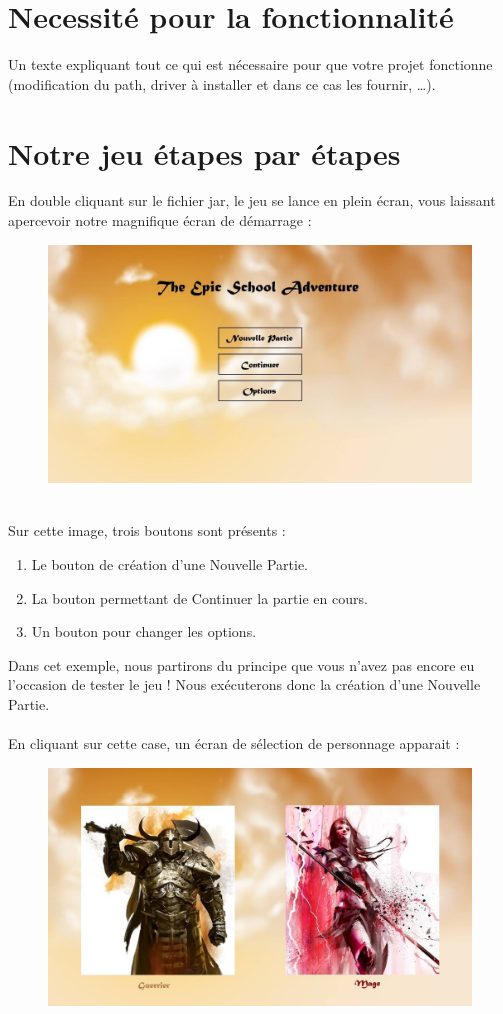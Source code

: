 \documentclass[a4paper,titlepage]{article}
\begin{document}
	\section{Necessité pour la fonctionnalité}
	Un texte expliquant tout ce qui est nécessaire pour que votre projet fonctionne (modification du path, driver à installer et dans ce cas les fournir, …).
	\clearpage
	
	\section{Notre jeu étapes par étapes}
	En double cliquant sur le fichier jar, le jeu se lance en plein écran, vous laissant apercevoir notre magnifique écran de démarrage :
	\begin{figure}[h!]
		\includegraphics[scale=0.30]{EcranDebut.jpg}
	\end{figure}
	\\Sur cette image, trois boutons sont présents : 
	\begin{enumerate}
		\item Le bouton de création d'une Nouvelle Partie.
		\item La bouton permettant de Continuer la partie en cours.
		\item Un bouton pour changer les options.
	\end{enumerate}
	Dans cet exemple, nous partirons du principe que vous n'avez pas encore eu l'occasion de tester le jeu ! Nous exécuterons donc la création d'une Nouvelle Partie.\\
	\\En cliquant sur cette case, un écran de sélection de personnage apparait :
	\begin{figure}[h!]
		\includegraphics[scale=0.30]{EcranCreationPersonnage.jpg}
	\end{figure}
\end{document}
